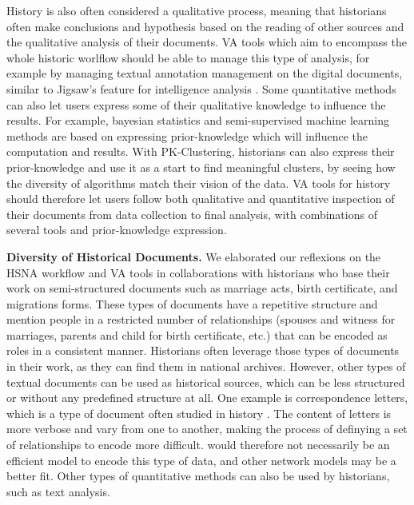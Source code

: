 History is also often considered a qualitative process, meaning that historians often make conclusions and hypothesis based on the reading of other sources and the qualitative analysis of their documents.
VA tools which aim to encompass the whole historic worlflow should be able to manage this type of analysis, for example by managing textual annotation management on the digital documents, similar to Jigsaw's feature for intelligence analysis \cite{staskoJigsawSupportingInvestigative2008}.
Some quantitative methods can also let users express some of their qualitative knowledge to influence the results.
For example, bayesian statistics and semi-supervised machine learning methods are based on expressing prior-knowledge which will influence the computation and results.
With PK-Clustering, historians can also express their prior-knowledge and use it as a start to find meaningful clusters, by seeing how the diversity of algorithms match their vision of the data.
VA tools for history should therefore let users follow both qualitative and quantitative inspection of their documents from data collection to final analysis, with combinations of several tools and prior-knowledge expression.




\noindent\textbf{Diversity of Historical Documents.} We elaborated our reflexions on the HSNA workflow and VA tools in collaborations with historians who base their work on semi-structured documents such as marriage acts, birth certificate, and migrations forms.
These types of documents have a repetitive structure and mention people in a restricted number of relationships (spouses and witness for marriages, parents and child for birth certificate, etc.) that can be encoded as roles in a consistent manner.
Historians often leverage those types of documents in their work, as they can find them in national archives.
However, other types of textual documents can be used as historical sources, which can be less structured or without any predefined structure at all.
One example is correspondence letters, which is a type of document often studied in history .
The content of letters is more verbose and vary from one to another, making the process of definying a set of relationships to encode more difficult.
\modelplural would therefore not necessarily be an efficient model to encode this type of data, and other network models may be a better fit.
Other types of quantitative methods can also be used by historians, such as text analysis.





